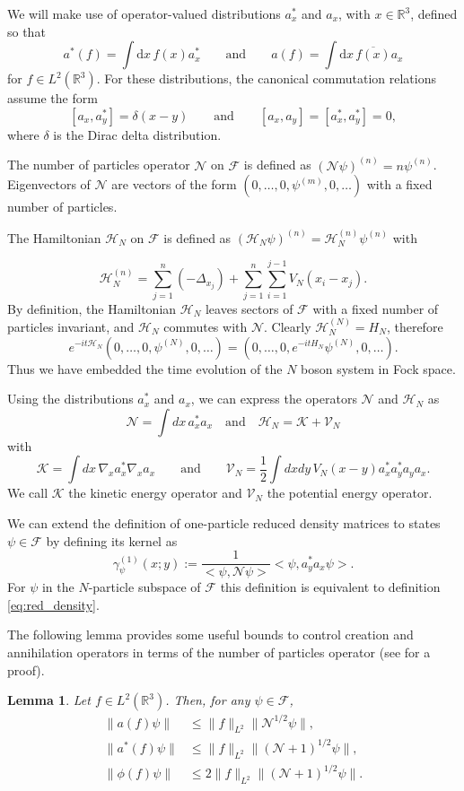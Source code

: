 \documentclass[11pt,a4paper,draft,DIV11]{scrartcl}	%
\newtheorem{lem}[thm]{Lemma}
\newcommand{\R}{\mathds{R}}
\newcommand{\N}{\mathcal{N}}
\newcommand{\K}{\mathcal{K}}
\newcommand{\fock}{\mathcal{F}}		%
\newcommand{\di}{\textrm{d}}		%
\newcommand{\Ncal}{\mathcal{N}}		%
\newcommand{\Hcal}{\mathcal{H}}		%
\newcommand{\scal}[2]{\big<#1,#2\big>} %
\newcommand{\cc}[1]{\overline{#1}}	%
\newcommand{\norm}[1]{\lVert#1\rVert}	%
\newcommand{\be}[1]{\begin{equation}\label{eq:#1}}	%
\newcommand{\ee}{\end{equation}}
\newcommand{\todo}[1]{}
\newcommand{\eqr}[1]{\eqref{eq:#1}}			%
\begin{document}
We will make use of operator-valued distributions $a_x^*$ and $a_x$, with $x
\in \R^3$, defined so that
\[
  a^*(f) = \int \di x\, f(x) a^*_x \qquad \text{and} \qquad a(f) = \int \di
  x\, \cc{f(x)} a_x
\]
for $f \in L^2(\R^3)$. For these distributions, the canonical commutation
relations assume the form
\[
  [a_x, a_y^*] = \delta(x-y) \qquad \text{and} \qquad [a_x, a_y] = [a_x^*,
  a_y^*] = 0,
\]
where $\delta$ is the Dirac delta distribution.


The number of particles operator $\mathcal{N}$ on $\mathcal{F}$ is defined as
$(\N \psi)^{(n)} = n \psi^{(n)}$. Eigenvectors of $\N$ are vectors of the form
$(0, \dots, 0, \psi^{(m)}, 0, \dots )$ with a fixed number of particles.


The Hamiltonian $\Hcal_N$ on $\mathcal{F}$ is defined as $(\Hcal_N
\psi)^{(n)} = \Hcal_N^{(n)} \psi^{(n)}$ with
\todo{Double sum inconsistent with single sum in other places.}
\[
  \Hcal_N^{(n)} = \sum_{j=1}^n (-\Delta_{x_j}) + \sum_{j=1}^n
  \sum_{i=1}^{j-1} V_N(x_i - x_j).
\]
By definition, the Hamiltonian $\Hcal_N$ leaves sectors of $\fock$ with a
fixed number of particles invariant, and $\Hcal_N$ commutes with $\N$.
Clearly $\Hcal_N^{(N)} = H_N$, therefore
\[
e^{-it \Hcal_N} (0,\dots,0, \psi^{(N)},0,\dots) = (0,\dots,0,
e^{-itH_N}\psi^{(N)},0,\dots).
\]
Thus we have embedded the time evolution of the $N$ boson system in Fock space.

Using the distributions $a_x^*$ and $a_x$, we can express the operators $\N$
and $\Hcal_N$ as
\[
  \N = \int dx \, a_x^* a_x \quad \mbox{and} \quad
  \Hcal_N = \K + \mathcal{V}_N
\]
with
\[
  \K = \int dx \, \nabla_x a_x^* \nabla_x a_x \qquad \text{and} \qquad
  \mathcal{V}_N = \frac{1}{2} \int dx dy \, V_N(x-y) a_x^* a_y^* a_y a_x.
\]
We call $\K$ the kinetic energy operator and $\mathcal{V}_N$ the potential
energy operator.

We can extend the definition of one-particle reduced density matrices to states $\psi \in \fock$ by defining its kernel as
\be{fock_density}
\gamma_{\psi}^{(1)}(x;y) := \frac{1}{\scal{\psi}{\Ncal \psi}} \scal{\psi}{a^\ast_y a_x \psi}.
\ee
For $\psi$ in the $N$-particle subspace of $\fock$ this definition is equivalent to definition \eqr{red_density}.

The following lemma provides some useful bounds to control creation and
annihilation operators in terms of the number of particles operator (see \cite{RS2009} for a proof).


\begin{lem} \label{l:a}
  Let $f \in L^2(\R^3)$. Then, for any $\psi \in
  \mathcal{F}$,
  \begin{equation} \label{aNorm}
    \begin{aligned}
      \norm{a(f)\psi} & \leq \norm{f}_{L^2} \norm{\Ncal^{1/2}\psi}, \\
      \norm{a^*(f)\psi} & \leq \norm{f}_{L^2} \norm{(\Ncal+1)^{1/2}\psi}, \\
      \norm{\phi(f) \psi} & \leq 2 \norm{f}_{L^2} \norm{(\N+1)^{1/2} \psi}.
    \end{aligned}
  \end{equation}
\end{lem}
\end{document}
